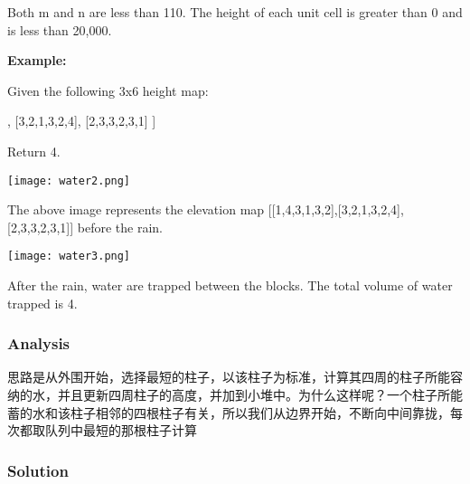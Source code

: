 Both m and n are less than 110. The height of each unit cell is greater than 0 and is less than 20,000.

\textbf{Example:}

Given the following 3x6 height map:
\begin{Code}
[
  [1,4,3,1,3,2],
  [3,2,1,3,2,4],
  [2,3,3,2,3,1]
]
\end{Code}
Return 4.

\begin{center}
\texttt{[image: water2.png]}\\
\end{center}

The above image represents the elevation map [[1,4,3,1,3,2],[3,2,1,3,2,4],[2,3,3,2,3,1]] before the rain.

\begin{center}
\texttt{[image: water3.png]}\\
\end{center}

After the rain, water are trapped between the blocks. The total volume of water trapped is 4.

\subsubsection{Analysis}
思路是从外围开始，选择最短的柱子，以该柱子为标准，计算其四周的柱子所能容纳的水，并且更新四周柱子的高度，并加到小堆中。为什么这样呢？一个柱子所能蓄的水和该柱子相邻的四根柱子有关，所以我们从边界开始，不断向中间靠拢，每次都取队列中最短的那根柱子计算

\newpage

\subsubsection{Solution}

